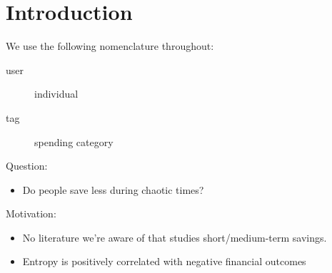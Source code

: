 
\section{Introduction}%
\label{sec:introduction}

We use the following nomenclature throughout:
\begin{description}
    \item[user] individual
    \item[tag] spending category
\end{description}

Question:
\begin{itemize}
    \item Do people save less during chaotic times?
\end{itemize}


Motivation:
\begin{itemize}
    \item No literature we're aware of that studies short/medium-term savings.
    \item Entropy is positively correlated with negative financial outcomes
        \citet{muggleton2020evidence}
\end{itemize}







